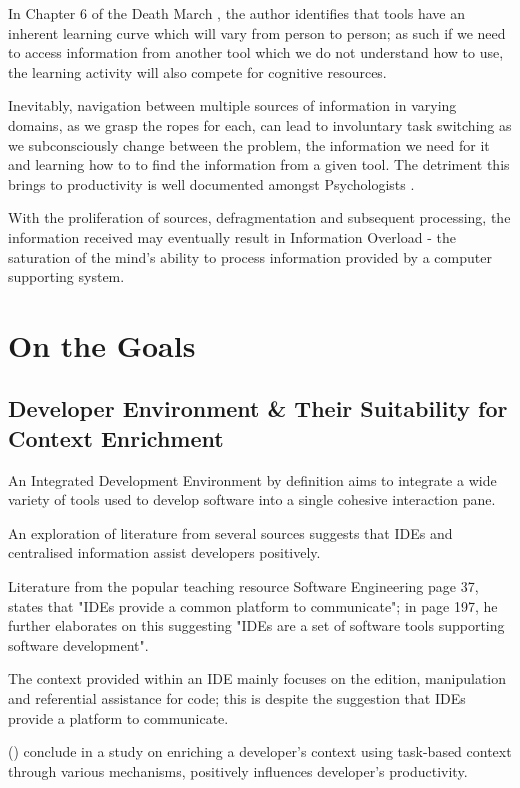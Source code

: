 In Chapter 6 of the Death March \parencite{yourdon2003death}, the author identifies that tools have an inherent learning curve which will vary from person to person; as such if we need to access information from another tool which we do not understand how to use, the learning activity will also compete for cognitive resources.

Inevitably, navigation between multiple sources of information in varying domains, as we grasp the ropes for each, can lead to involuntary task switching as we subconsciously change between the problem, the information we need for it and learning how to to find the information from a given tool. The detriment this brings to productivity is well documented amongst Psychologists \parencite{apaMultitasking}.

With the proliferation of sources, defragmentation and subsequent processing, the information received may eventually result in Information Overload - the saturation of the mind's ability to process information provided by a computer supporting system.

\section{On the Goals}

\subsection{Developer Environment \& Their Suitability for Context Enrichment}

An Integrated Development Environment by definition aims to integrate a wide variety of tools used to develop software into a single cohesive interaction pane. 

An exploration of literature from several sources suggests that IDEs and centralised information assist developers positively. 

Literature from the popular teaching resource Software Engineering \parencite{Sommerville:2010:SE:1841764} page 37, states that "IDEs provide a common platform to communicate"; in page 197, he further elaborates on this suggesting "IDEs are a set of software tools supporting software development".

The context provided within an IDE mainly focuses on the edition, manipulation and referential assistance for code; this is despite the suggestion that IDEs provide a platform to communicate.

\citeauthor{kersten2006using} () conclude in a study on enriching a developer's context using task-based context through various mechanisms, positively influences developer's productivity.

